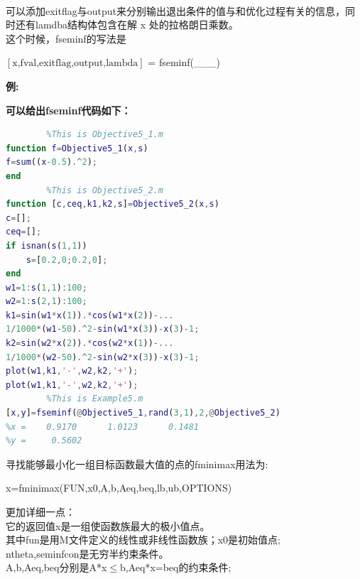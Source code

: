 \documentclass[a4paper,20pt]{article}
\begin{document}
    \\可以添加exitflag与output来分别输出退出条件的值与和优化过程有关的信息，同时还有lamdba结构体包含在解 x 处的拉格朗日乘数。
    \\这个时候，fseminf的写法是
    \begin{center}
        $\left[\text{x,fval,exitflag,output,lambda}\right]$ = fseminf(\_\_\_)
    \end{center}
    \par \textbf{例:}
    \par \noindent {}
    \par \noindent \textbf{可以给出fseminf代码如下：}
    \begin{center}
        \begin{lstlisting}[caption={Fseminf},language=Matlab]
% NonLinear Programming
        %This is Objective5_1.m
function f=Objective5_1(x,s)
f=sum((x-0.5).^2);
end
        %This is Objective5_2.m
function [c,ceq,k1,k2,s]=Objective5_2(x,s)
c=[];
ceq=[];
if isnan(s(1,1))
    s=[0.2,0;0.2,0];
end
w1=1:s(1,1):100;
w2=1:s(2,1):100;
k1=sin(w1*x(1)).*cos(w1*x(2))-...
1/1000*(w1-50).^2-sin(w1*x(3))-x(3)-1;
k2=sin(w2*x(2)).*cos(w2*x(1))-...
1/1000*(w2-50).^2-sin(w2*x(3))-x(3)-1;
plot(w1,k1,'-',w2,k2,'+');
plot(w1,k1,'-',w2,k2,'+');
        %This is Example5.m
[x,y]=fseminf(@Objective5_1,rand(3,1),2,@Objective5_2)
%x =    0.9170      1.0123      0.1481
%y =     0.5602
            \end{lstlisting}
    \end{center}
    \par \noindent 寻找能够最小化一组目标函数最大值的点的fminimax用法为:
    \begin{center}
        x=fminimax(FUN,x0,A,b,Aeq,beq,lb,ub,OPTIONS)
    \end{center}
    \par \noindent 更加详细一点：
    \\它的返回值x是一组使函数族最大的极小值点。
    \\其中fun是用M文件定义的线性或非线性函数族；x0是初始值点;
    \\ntheta,seminfcon是无穷半约束条件。
    \\A,b,Aeq,beq分别是A*x$\leq$b,Aeq*x=beq的约束条件;
\end{document}

